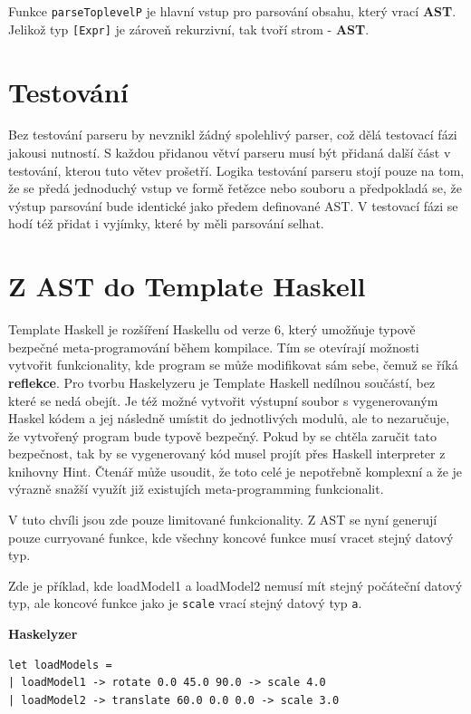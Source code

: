 \documentclass[male,czech]{kithesis}
\newcommand{\haskellInline}[1]{\colorbox{gray!10}{\texttt{#1}}}
\begin{document}
Funkce \haskellInline{parseToplevelP} je hlavní vstup pro parsování obsahu,
který vrací \textbf{AST}. 
Jelikož typ \haskellInline{[Expr]} je zároveň rekurzivní,
tak tvoří strom - \textbf{AST}.

\section{Testování}

Bez testování parseru by nevznikl žádný spolehlivý parser, 
což dělá testovací fázi jakousi nutností.
S každou přidanou větví parseru musí být přidaná další část v testování,
kterou tuto větev prošetří. 
Logika testování parseru stojí pouze na tom,
že se předá jednoduchý vstup ve formě řetězce nebo souboru
a předpokladá se, 
že výstup parsování bude identické jako předem definované AST.
V testovací fázi se hodí též přidat i vyjímky,
které by měli parsování selhat.

\section{Z AST do Template Haskell}
Template Haskell je rozšíření Haskellu od verze 6, 
který umožňuje typově bezpečné meta-programování během kompilace.
Tím se otevírají možnosti vytvořit funkcionality, 
kde program se může modifikovat sám sebe, 
čemuž se říká \textbf{reflekce}.
Pro tvorbu Haskelyzeru je Template Haskell nedílnou součástí,
bez které se nedá obejít.
Je též možné vytvořit výstupní soubor s vygenerovaným Haskel kódem a 
jej následně umístit do jednotlivých modulů,
ale to nezaručuje, 
že vytvořený program bude typově bezpečný.
Pokud by se chtěla zaručit tato bezpečnost,
tak by se vygenerovaný kód musel projít přes 
Haskell interpreter z knihovny Hint.
Čtenář může usoudit, 
že toto celé je nepotřebně komplexní a 
že je výrazně snažší využít již existujích meta-programming funkcionalit. 

V tuto chvíli jsou zde pouze limitované funkcionality.
Z AST se nyní generují pouze curryované funkce,
kde všechny koncové funkce musí vracet stejný datový typ.

Zde je příklad, 
kde loadModel1 a 
loadModel2 nemusí mít stejný počáteční datový typ, 
ale koncové funkce jako je \haskellInline{scale} 
vrací stejný datový typ \haskellInline{a}.

\textbf{Haskelyzer}
\begin{verbatim}
let loadModels =
| loadModel1 -> rotate 0.0 45.0 90.0 -> scale 4.0
| loadModel2 -> translate 60.0 0.0 0.0 -> scale 3.0
\end{verbatim}
\end{document}
